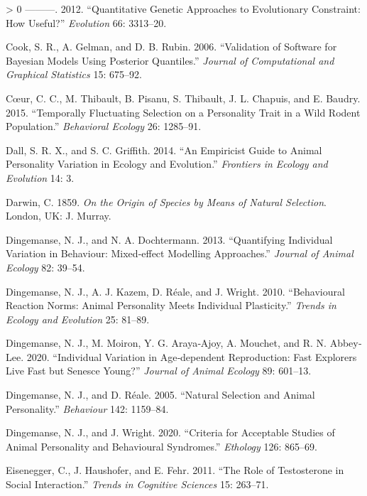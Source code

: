 \documentclass{article}
\newlength{\cslhangindent}
\newenvironment{CSLReferences}[3] %
 {%
  \setlength{\parindent}{0pt}
  \ifodd #1 \everypar{\setlength{\hangindent}{\cslhangindent}}\ignorespaces\fi
  \ifnum #2 > 0
  \setlength{\parskip}{#2\baselineskip}
  \fi
 }%
 {}
\begin{document}
\begin{CSLReferences}{1}{0}
\leavevmode\hypertarget{ref-Conner2012}{}%
---------. 2012. {``Quantitative Genetic Approaches to Evolutionary
Constraint: How Useful?''} \emph{Evolution} 66: 3313--20.

\leavevmode\hypertarget{ref-Cook2006}{}%
Cook, S. R., A. Gelman, and D. B. Rubin. 2006. {``Validation of Software
for Bayesian Models Using Posterior Quantiles.''} \emph{Journal of
Computational and Graphical Statistics} 15: 675--92.

\leavevmode\hypertarget{ref-LC2015}{}%
Cœur, C. C., M. Thibault, B. Pisanu, S. Thibault, J. L. Chapuis, and E.
Baudry. 2015. {``Temporally Fluctuating Selection on a Personality Trait
in a Wild Rodent Population.''} \emph{Behavioral Ecology} 26: 1285--91.

\leavevmode\hypertarget{ref-Dall2014}{}%
Dall, S. R. X., and S. C. Griffith. 2014. {``An Empiricist Guide to
Animal Personality Variation in Ecology and Evolution.''}
\emph{Frontiers in Ecology and Evolution} 14: 3.

\leavevmode\hypertarget{ref-Darwin}{}%
Darwin, C. 1859. \emph{On the Origin of Species by Means of Natural
Selection}. London, UK: J. Murray.

\leavevmode\hypertarget{ref-DingDocht2013}{}%
Dingemanse, N. J., and N. A. Dochtermann. 2013. {``Quantifying
Individual Variation in Behaviour: Mixed‐effect Modelling Approaches.''}
\emph{Journal of Animal Ecology} 82: 39--54.

\leavevmode\hypertarget{ref-Ding2010}{}%
Dingemanse, N. J., A. J. Kazem, D. Réale, and J. Wright. 2010.
{``Behavioural Reaction Norms: Animal Personality Meets Individual
Plasticity.''} \emph{Trends in Ecology and Evolution} 25: 81--89.

\leavevmode\hypertarget{ref-Ding2020b}{}%
Dingemanse, N. J., M. Moiron, Y. G. Araya‐Ajoy, A. Mouchet, and R. N.
Abbey‐Lee. 2020. {``Individual Variation in Age‐dependent Reproduction:
Fast Explorers Live Fast but Senesce Young?''} \emph{Journal of Animal
Ecology} 89: 601--13.

\leavevmode\hypertarget{ref-Ding2005}{}%
Dingemanse, N. J., and D. Réale. 2005. {``Natural Selection and Animal
Personality.''} \emph{Behaviour} 142: 1159--84.

\leavevmode\hypertarget{ref-Ding2020}{}%
Dingemanse, N. J., and J. Wright. 2020. {``Criteria for Acceptable
Studies of Animal Personality and Behavioural Syndromes.''}
\emph{Ethology} 126: 865--69.

\leavevmode\hypertarget{ref-Eis2011}{}%
Eisenegger, C., J. Haushofer, and E. Fehr. 2011. {``The Role of
Testosterone in Social Interaction.''} \emph{Trends in Cognitive
Sciences} 15: 263--71.


\end{CSLReferences}
\end{document}
